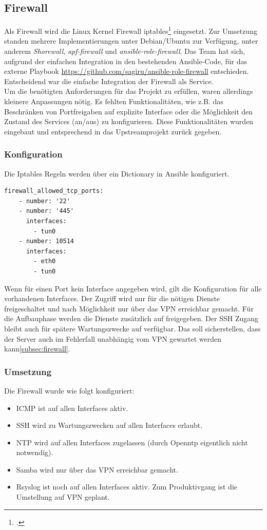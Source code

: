 \subsection{Firewall}
Als Firewall wird die Linux Kernel Firewall iptables\footcite{iptables} eingesetzt. Zur Umsetzung standen mehrere Implementierungen unter Debian/Ubuntu zur Verfügung, unter anderem \emph{Shorewall}, \emph{apf-firewall} und \emph{ansible-role-firewall}. Das Team hat sich, aufgrund der einfachen Integration in den bestehenden Ansible-Code, für das externe Playbook \url{https://github.com/sagiru/ansible-role-firewall} entschieden. Entscheidend war die einfache Integration der Firewall als Service. \\

Um die benötigten Anforderungen für das Projekt zu erfüllen, waren allerdings kleinere Anpassungen nötig. Es fehlten Funktionalitäten, wie z.B. das Beschränken von Portfreigaben auf explizite Interface oder die Möglichkeit den Zustand des Services (an/aus) zu konfigurieren. Diese Funktionalitäten wurden eingebaut und entsprechend in das Upstreamprojekt zurück gegeben.

\subsubsection{Konfiguration}
Die Iptables Regeln werden über ein Dictionary in Ansible konfiguriert.

\begin{lstlisting}[label=code:smbconf5,caption=Auszug aus der Datei ansible/group\_vars/file\_server\_sued/public]
  firewall_allowed_tcp_ports:
    - number: '22'
    - number: '445'
      interfaces:
        - tun0
    - number: 10514
      interfaces:
        - eth0
        - tun0
\end{lstlisting}

Wenn für einen Port kein Interface angegeben wird, gilt die Konfiguration für alle vorhandenen Interfaces. Der Zugriff wird nur für die nötigen Dienste freigeschaltet und nach Möglichkeit nur über das VPN erreichbar gemacht. Für die Aufbauphase werden die Dienste zusätzlich auf  freigegeben. Der SSH Zugang bleibt auch für spätere Wartungszwecke auf  verfügbar. Das soll sicherstellen, dass der Server auch im Fehlerfall unabhängig vom VPN gewartet werden kann\ref{subsec:firewall}.

\subsubsection{Umsetzung}
Die Firewall wurde wie folgt konfiguriert:
\begin{itemize}
\item ICMP ist auf allen Interfaces aktiv.
\item SSH wird zu Wartungszwecken auf allen Interfaces erlaubt.
\item NTP wird auf allen Interfaces zugelassen (durch Openntp eigentlich nicht notwendig).
\item Samba wird nur über das VPN erreichbar gemacht.
\item Rsyslog ist noch auf allen Interfaces aktiv. Zum Produktivgang ist die Umstellung auf VPN geplant.
\end{itemize}

